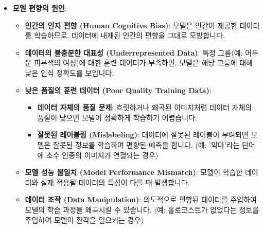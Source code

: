 \documentclass[11pt,a4paper]{article}
\theoremstyle{definition}
\begin{document}
\begin{itemize}
\begin{itemize}
    \begin{itemize}
        \item \textbf{모델 편향의 원인}:
        \begin{itemize}
            \item \textbf{인간의 인지 편향 (Human Cognitive Bias)}: 모델은 인간이 제공한 데이터를 학습하므로, 데이터에 내재된 인간의 편향을 그대로 모방합니다.
            \item \textbf{데이터의 불충분한 대표성 (Underrepresented Data)}: 특정 그룹(예: 어두운 피부색의 여성)에 대한 훈련 데이터가 부족하면, 모델은 해당 그룹에 대해 낮은 인식 정확도를 보입니다.
            \item \textbf{낮은 품질의 훈련 데이터 (Poor Quality Training Data)}:
            \begin{itemize}
                \item \textbf{데이터 자체의 품질 문제}: 흐릿하거나 왜곡된 이미지처럼 데이터 자체의 품질이 낮으면 모델이 정확하게 학습하기 어렵습니다.
                \item \textbf{잘못된 레이블링 (Mislabeling)}: 데이터에 잘못된 레이블이 부여되면 모델은 잘못된 정보를 학습하여 편향된 예측을 합니다. (예: '악마'라는 단어에 소수 인종의 이미지가 연결되는 경우)
            \end{itemize}
            \item \textbf{모델 성능 불일치 (Model Performance Mismatch)}: 모델이 학습한 데이터와 실제 적용될 데이터의 특성이 다를 때 발생합니다.
            \item \textbf{데이터 조작 (Data Manipulation)}: 의도적으로 편향된 데이터를 주입하여 모델의 학습 과정을 왜곡시킬 수 있습니다. (예: 홀로코스트가 없었다는 정보를 주입하여 모델이 환각을 일으키는 경우)
        \end{itemize}


\end{itemize}
\end{itemize}
\end{itemize}
\end{document}
